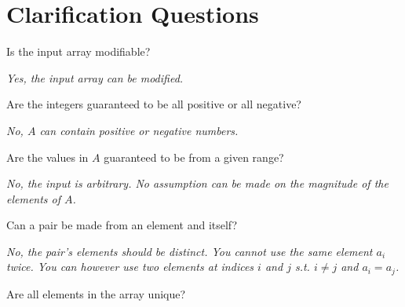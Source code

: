 \section{Clarification Questions}
\begin{QandA}
	\item \begin{questionitem} \begin{question} Is the input array modifiable?  \end{question} 	 
    \begin{answered}
		\textit{Yes, the input array can be modified.}
	\end{answered} \end{questionitem}	
	\item \begin{questionitem} \begin{question} Are the integers guaranteed to be all positive or all negative?   \end{question} 	 
    \begin{answered}
		\textit{No, $A$ can contain positive or negative numbers.}
	\end{answered} \end{questionitem}
	\item \begin{questionitem} \begin{question} Are the values in $A$ guaranteed to be from a given range?  \end{question} 	 
    \begin{answered}
		\textit{No, the input is arbitrary. No assumption can be made on the magnitude of the elements of $A$.}
	\end{answered} \end{questionitem}
	\item \begin{questionitem} \begin{question} Can a pair be made from an element and itself?  \end{question} 	 
    \begin{answered}
		\textit{No, the pair's elements should be distinct. You cannot use the same element $a_i$ twice. You can however use two elements at indices $i$ and $j$ s.t. $i \neq j$ and $a_i=a_j$.}
	\end{answered} \end{questionitem}
	\item \begin{questionitem} \begin{question} Are all elements in the array unique?  \end{question} 	 

\end{questionitem}
\end{QandA}
